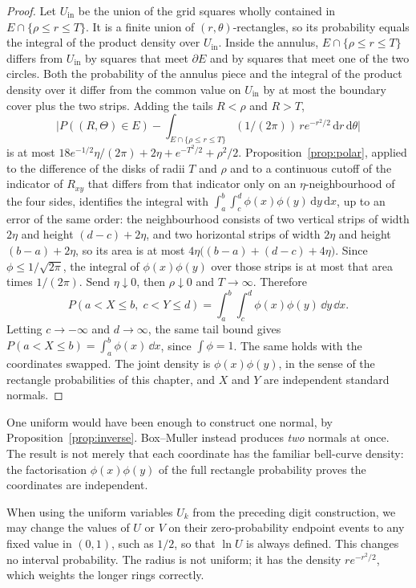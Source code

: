 \begin{proof}
Let $U_{\mathrm{in}}$ be the union of the grid squares wholly contained in $E\cap\{\rho\le r\le T\}$. It is a finite union of $(r,\theta)$-rectangles, so its probability equals the integral of the product density over $U_{\mathrm{in}}$. Inside the annulus, $E\cap\{\rho\le r\le T\}$ differs from $U_{\mathrm{in}}$ by squares that meet $\partial E$ and by squares that meet one of the two circles. Both the probability of the annulus piece and the integral of the product density over it differ from the common value on $U_{\mathrm{in}}$ by at most the boundary cover plus the two strips. Adding the tails $R<\rho$ and $R>T$,
\[
 \bigl|P((R,\Theta)\in E)-\textstyle\int_{E\cap\{\rho\le r\le T\}}(1/(2\pi))\,r e^{-r^2/2}\,\mathrm dr\,\mathrm d\theta\bigr|
\]
is at most $18e^{-1/2}\eta/(2\pi)+2\eta+e^{-T^2/2}+\rho^2/2$. Proposition~\ref{prop:polar}, applied to the difference of the disks of radii $T$ and $\rho$ and to a continuous cutoff of the indicator of $R_{xy}$ that differs from that indicator only on an $\eta$-neighbourhood of the four sides, identifies the integral with $\int_a^b\int_c^d\phi(x)\phi(y)\,\mathrm dy\,\mathrm dx$, up to an error of the same order: the neighbourhood consists of two vertical strips of width $2\eta$ and height $(d-c)+2\eta$, and two horizontal strips of width $2\eta$ and height $(b-a)+2\eta$, so its area is at most $4\eta\bigl((b-a)+(d-c)+4\eta\bigr)$. Since $\phi\le 1/\sqrt{2\pi}$, the integral of $\phi(x)\phi(y)$ over those strips is at most that area times $1/(2\pi)$. Send $\eta\downarrow0$, then $\rho\downarrow0$ and $T\to\infty$. Therefore
\[
 P(a<X\le b,\; c<Y\le d)=\int_a^b\int_c^d\phi(x)\phi(y)\,\dd y\,\dd x.
\]
Letting $c\to-\infty$ and $d\to\infty$, the same tail bound gives $P(a<X\le b)=\int_a^b\phi(x)\,\dd x$, since $\int\phi=1$. The same holds with the coordinates swapped. The joint density is $\phi(x)\phi(y)$, in the sense of the rectangle probabilities of this chapter, and $X$ and $Y$ are independent standard normals.
\end{proof}

One uniform would have been enough to construct one normal, by Proposition~\ref{prop:inverse}. Box--Muller instead produces \emph{two} normals at once. The result is not merely that each coordinate has the familiar bell-curve density: the factorisation $\phi(x)\phi(y)$ of the full rectangle probability proves the coordinates are independent.

When using the uniform variables $U_k$ from the preceding digit construction, we may change the values of $U$ or $V$ on their zero-probability endpoint events to any fixed value in $(0,1)$, such as $1/2$, so that $\ln U$ is always defined. This changes no interval probability. The radius is not uniform; it has the density $r e^{-r^2/2}$, which weights the longer rings correctly.


